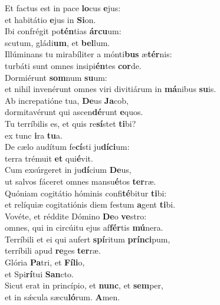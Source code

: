 \evenverse Et factus est in pace \textbf{lo}cus \textbf{e}jus:~\*\\
\evenverse et habitátio \textbf{e}jus in \textbf{Si}on.\\
\oddverse Ibi confrégit po\textbf{tén}tias \textbf{ár}\textbf{cu}um:~\*\\
\oddverse scutum, gládi\textbf{um}, et \textbf{bel}lum.\\
\evenverse Illúminans tu mirabíliter a mónti\textbf{bus} æ\textbf{tér}nis:~\*\\
\evenverse turbáti sunt omnes insipi\textbf{én}tes \textbf{cor}de.\\
\oddverse Dormiérunt \textbf{som}num \textbf{su}um:~\*\\
\oddverse et nihil invenérunt omnes viri divitiárum in \textbf{má}nibus \textbf{su}is.\\
\evenverse Ab increpatióne tua, \textbf{De}us \textbf{Ja}cob,~\*\\
\evenverse dormitavérunt qui ascen\textbf{dé}runt \textbf{e}quos.\\
\oddverse Tu terríbilis es, et quis re\textbf{sí}stet \textbf{ti}bi?~\*\\
\oddverse ex tunc \textbf{i}ra \textbf{tu}a.\\
\evenverse De cælo audítum fe\textbf{cí}sti ju\textbf{dí}\textbf{ci}um:~\*\\
\evenverse terra trémuit \textbf{et} qui\textbf{é}vit.\\
\oddverse Cum exsúrgeret in ju\textbf{dí}cium \textbf{De}us,~\*\\
\oddverse ut salvos fáceret omnes mansu\textbf{é}tos \textbf{ter}ræ.\\
\evenverse Quóniam cogitátio hóminis confi\textbf{té}bitur \textbf{ti}bi:~\*\\
\evenverse et relíquiæ cogitatiónis diem festum \textbf{a}gent \textbf{ti}bi.\\
\oddverse Vovéte, et réddite Dómino \textbf{De}o \textbf{ve}stro:~\*\\
\oddverse omnes, qui in circúitu ejus af\textbf{fér}tis \textbf{mú}nera.\\
\evenverse Terríbili et ei qui aufert \textbf{spí}ritum \textbf{prín}\textbf{ci}pum,~\*\\
\evenverse terríbili apud \textbf{re}ges \textbf{ter}ræ.\\
\oddverse Glória \textbf{Pa}tri, et \textbf{Fí}\textbf{li}o,~\*\\
\oddverse et Spi\textbf{rí}tui \textbf{San}cto.\\
\evenverse Sicut erat in princípio, et \textbf{nunc}, et \textbf{sem}per,~\*\\
\evenverse et in sǽcula sæcu\textbf{ló}rum. \textbf{A}men.\\
